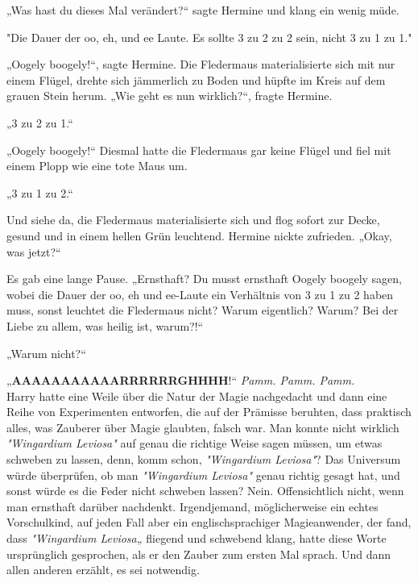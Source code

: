 {„Was hast du dieses Mal verändert?“ sagte Hermine und klang ein wenig müde.

"Die Dauer der oo, eh, und ee Laute. Es sollte 3 zu 2 zu 2 sein, nicht 3 zu 1 zu 1."

„Oogely boogely!“, sagte Hermine. Die Fledermaus materialisierte sich mit nur einem Flügel, drehte sich jämmerlich zu Boden und hüpfte im Kreis auf dem grauen Stein herum. „Wie geht es nun wirklich?“, fragte Hermine.

„3 zu 2 zu 1.“

„Oogely boogely!“ Diesmal hatte die Fledermaus gar keine Flügel und fiel mit einem Plopp wie eine tote Maus um.

„3 zu 1 zu 2.“

Und siehe da, die Fledermaus materialisierte sich und flog sofort zur Decke, gesund und in einem hellen Grün leuchtend. Hermine nickte zufrieden. „Okay, was jetzt?“

Es gab eine lange Pause. „Ernsthaft? Du musst ernsthaft Oogely boogely sagen, wobei die Dauer der oo, eh und ee-Laute ein Verhältnis von 3 zu 1 zu 2 haben muss, sonst leuchtet die Fledermaus nicht? Warum eigentlich? Warum? Bei der Liebe zu allem, was heilig ist, warum?!“

„Warum nicht?“

„\textbf{AAAAAAAAAAARRRRRRGHHHH}!“ \emph{Pamm. Pamm. Pamm.}\\ Harry hatte eine Weile über die Natur der Magie nachgedacht und dann eine Reihe von Experimenten entworfen, die auf der Prämisse beruhten, dass praktisch alles, was Zauberer über Magie glaubten, falsch war. Man konnte nicht wirklich \emph{"Wingardium Leviosa"} auf genau die richtige Weise sagen müssen, um etwas schweben zu lassen, denn, komm schon, \emph{"Wingardium Leviosa"}? Das Universum würde überprüfen, ob man \emph{"Wingardium Leviosa"} genau richtig gesagt hat, und sonst würde es die Feder nicht schweben lassen? Nein. Offensichtlich nicht, wenn man ernsthaft darüber nachdenkt. Irgendjemand, möglicherweise ein echtes Vorschulkind, auf jeden Fall aber ein englischsprachiger Magieanwender, der fand, dass \emph{"Wingardium Leviosa„} fliegend und schwebend klang, hatte diese Worte ursprünglich gesprochen, als er den Zauber zum ersten Mal sprach. Und dann allen anderen erzählt, es sei notwendig.

}
